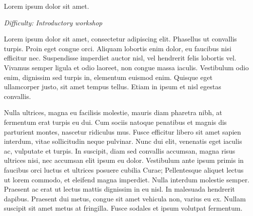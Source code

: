 %
%
%

\newif\ifprint
\printtrue



\newcommand{\workshopTitle}{Workshop n: }

\newcommand{\workshopAuthor}{Joe Bloggs}



	
	
	Lorem ipsum dolor sit amet.
	
	\textit{Difficulty: Introductory workshop}
	
	\tableofcontents
	\vspace{12pt}
	
	
	Lorem ipsum dolor sit amet, consectetur adipiscing elit. Phasellus ut convallis turpis. Proin eget congue orci. Aliquam lobortis enim dolor, eu faucibus nisi efficitur nec. Suspendisse imperdiet auctor nisl, vel hendrerit felis lobortis vel. Vivamus semper ligula et odio laoreet, non congue massa iaculis. Vestibulum odio enim, dignissim sed turpis in, elementum euismod enim. Quisque eget ullamcorper justo, sit amet tempus tellus. Etiam in ipsum et nisl egestas convallis.
	
	Nulla ultrices, magna eu facilisis molestie, mauris diam pharetra nibh, at fermentum erat turpis eu dui. Cum sociis natoque penatibus et magnis dis parturient montes, nascetur ridiculus mus. Fusce efficitur libero sit amet sapien interdum, vitae sollicitudin neque pulvinar. Nunc dui elit, venenatis eget iaculis ac, vulputate et turpis. In suscipit, diam sed convallis accumsan, magna risus ultrices nisi, nec accumsan elit ipsum eu dolor. Vestibulum ante ipsum primis in faucibus orci luctus et ultrices posuere cubilia Curae; Pellentesque aliquet lectus ut lorem commodo, et eleifend magna imperdiet. Nulla interdum molestie semper. Praesent ac erat ut lectus mattis dignissim in eu nisl. In malesuada hendrerit dapibus. Praesent dui metus, congue sit amet vehicula non, varius eu ex. Nullam suscipit sit amet metus at fringilla. Fusce sodales et ipsum volutpat fermentum.
	
